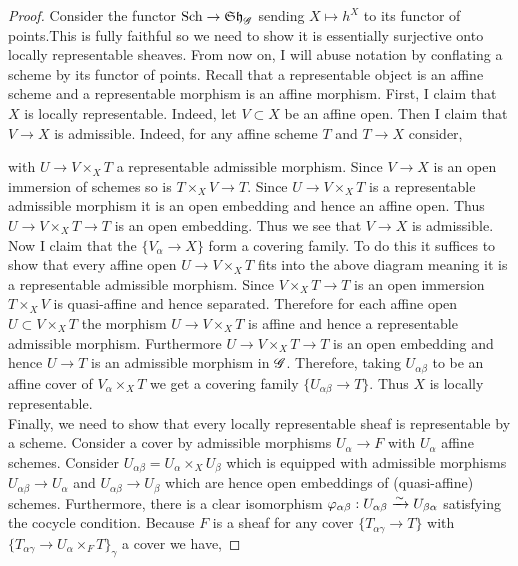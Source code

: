 \documentclass[12pt]{article}
\begin{document}
\begin{proof}
Consider the functor $\mathrm{Sch} \to \mathfrak{Sh}_{\mathscr{G}}$ sending $X \mapsto h^X$ to its functor of points.This is fully faithful so we need to show it is essentially surjective onto locally representable sheaves.  From now on, I will abuse notation by conflating a scheme by its functor of points. Recall that a representable object is an affine scheme and a representable morphism is an affine morphism.  First, I claim that $X$ is locally representable. Indeed, let $V \subset X$ be an affine open. Then I claim that $V \to X$ is admissible. Indeed, for any affine scheme $T$ and $T \to X$ consider,
\begin{center}
\end{center}
with $U \to V \times_X T$ a representable admissible morphism. Since $V \to X$ is an open immersion of schemes so is $T \times_X V \to T$. Since $U \to V \times_X T$ is a representable admissible morphism it is an open embedding and hence an affine open. Thus $U \to V \times_X T \to T$ is an open embedding. Thus we see that $V \to X$ is admissible. Now I claim that the $\{ V_\alpha \to X \}$ form a covering family. To do this it suffices to show that every affine open $U \to V \times_X T$ fits into the above diagram meaning it is a representable admissible morphism. Since $V \times_X T \to T$ is an open immersion $T \times_X V$ is quasi-affine and hence separated. Therefore for each affine open $U \subset V \times_X T$ the morphism $U \to V \times_X T$ is affine and hence a representable admissible morphism. Furthermore $U \to V \times_X T \to T$ is an open embedding and hence $U \to T$ is an admissible morphism in $\mathscr{G}$. Therefore, taking $U_{\alpha \beta}$ to be an affine cover of $V_\alpha \times_X T$ we get a covering family $\{ U_{\alpha \beta} \to T \}$. Thus $X$ is locally representable. 
\bigskip\\
Finally, we need to show that every locally representable sheaf is representable by a scheme. Consider a cover by admissible morphisms $U_\alpha \to F$ with $U_\alpha$ affine schemes. Consider $U_{\alpha\beta} = U_\alpha \times_X U_\beta$ which is equipped with admissible morphisms $U_{\alpha\beta} \to U_\alpha$ and $U_{\alpha\beta} \to U_\beta$ which are hence open embeddings of (quasi-affine) schemes. Furthermore, there is a clear isomorphism $\varphi_{\alpha \beta} : U_{\alpha \beta} \xrightarrow{\sim} U_{\beta \alpha}$ satisfying the cocycle condition. Because $F$ is a sheaf for any cover $\{ T_{\alpha \gamma} \to T \}$ with $\{ T_{\alpha \gamma} \to U_\alpha \times_F T \}_\gamma$ a cover we have,

\end{proof}
\end{document}
